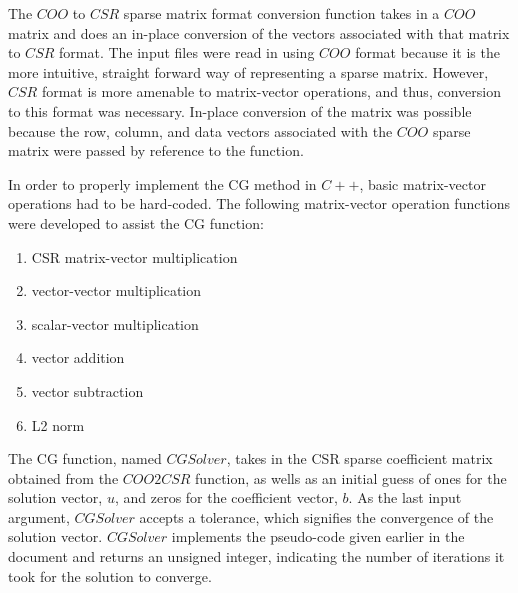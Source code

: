 \documentclass{homework}
\begin{document}
The $COO$ to $CSR$ sparse matrix format conversion function takes in a $COO$ matrix and does an in-place conversion of the vectors associated with that matrix to $CSR$ format. The input files were read in using $COO$ format because it is the more intuitive, straight forward way of representing a sparse matrix. However, $CSR$ format is more amenable to matrix-vector operations, and thus, conversion to this format was necessary. In-place conversion of the matrix was possible because the row, column, and data vectors associated with the $COO$ sparse matrix were passed by reference to the function. 

In order to properly implement the CG method in $C++$, basic matrix-vector operations had to be hard-coded. The following matrix-vector operation functions were developed to assist the CG function: 
\begin{enumerate}
\item CSR matrix-vector multiplication 
\item vector-vector multiplication
\item scalar-vector multiplication
\item vector addition
\item vector subtraction 
\item L2 norm
\end{enumerate}

The CG function, named $CGSolver$, takes in the CSR sparse coefficient matrix obtained from the $COO2CSR$ function, as wells as an initial guess of ones for the solution vector, $u$, and zeros for the coefficient vector, $b$. As the last input argument, $CGSolver$ accepts a tolerance, which signifies the convergence of the solution vector. $CGSolver$ implements the pseudo-code given earlier in the document and returns an unsigned integer, indicating the number of iterations it took for the solution to converge. 
\end{document}

